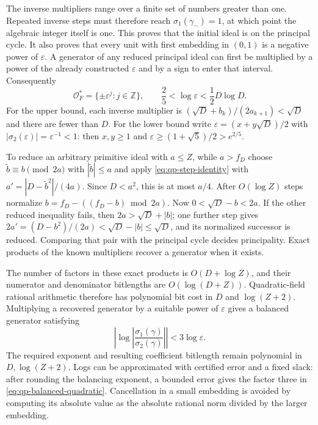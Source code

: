 The inverse multipliers range over a finite set of numbers greater than
one.  Repeated inverse steps must therefore reach
$\sigma_1(\gamma_-)=1$, at which point the algebraic integer itself is
one.  This proves that the initial ideal is on the principal cycle.
It also proves that every unit with first embedding in $(0,1)$ is a
negative power of $\varepsilon$.  A generator of any reduced principal
ideal can first be multiplied by a power of the already constructed
$\varepsilon$ and by a sign to enter that interval.  Consequently
\begin{equation}
 \mathcal O_F^*=\{\pm\varepsilon^j:j\in\mathbb Z\},
 \qquad \frac25<\log\varepsilon<\frac12D\log D.
 \label{eq:qp-unit-bounds}
\end{equation}
For the upper bound, each inverse multiplier is
$(\sqrt D+b_k)/(2a_{k+1})<\sqrt D$ and there are fewer than $D$.
For the lower bound write $\varepsilon=(x+y\sqrt D)/2$ with
$|\sigma_2(\varepsilon)|=\varepsilon^{-1}<1$: then $x,y\geq1$ and
$\varepsilon\geq(1+\sqrt5)/2>e^{2/5}$.

To reduce an arbitrary primitive ideal with $a\leq Z$, while $a>f_D$
choose $\widetilde b\equiv b\pmod{2a}$ with
$|\widetilde b|\leq a$ and apply \eqref{eq:qp-step-identity} with
$a'=|D-\widetilde b^2|/(4a)$.  Since $D<a^2$, this is at most $a/4$.
After $O(\log Z)$ steps normalize
$b=f_D-((f_D-b)\bmod2a)$.  Now
$0<\sqrt D-b<2a$.  If the other reduced inequality fails, then
$2a>\sqrt D+|b|$; one further step gives
$2a'=(D-b^2)/(2a)<\sqrt D-|b|\leq\sqrt D$, and its normalized
successor is reduced.  Comparing that pair with the principal cycle
decides principality.  Exact products of the known multipliers recover a
generator when it exists.

The number of factors in these exact products is $O(D+\log Z)$, and
their numerator and denominator bitlengths are $O(\log(D+Z))$.
Quadratic-field rational arithmetic therefore has polynomial bit cost in
$D$ and $\log(Z+2)$.  Multiplying a recovered generator by a suitable
power of $\varepsilon$ gives a balanced generator satisfying
\begin{equation}
 \left|\log\left|\frac{\sigma_1(\gamma)}{\sigma_2(\gamma)}\right|\right|
 <3\log\varepsilon.
 \label{eq:qp-balanced-quadratic}
\end{equation}
The required exponent and resulting coefficient bitlength remain
polynomial in $D,\log(Z+2)$.  Logs can be approximated with certified
error and a fixed slack: after rounding the balancing exponent, a
bounded error gives the factor three in
\eqref{eq:qp-balanced-quadratic}.  Cancellation in a small embedding is
avoided by computing its absolute value as the absolute rational norm
divided by the larger embedding.

